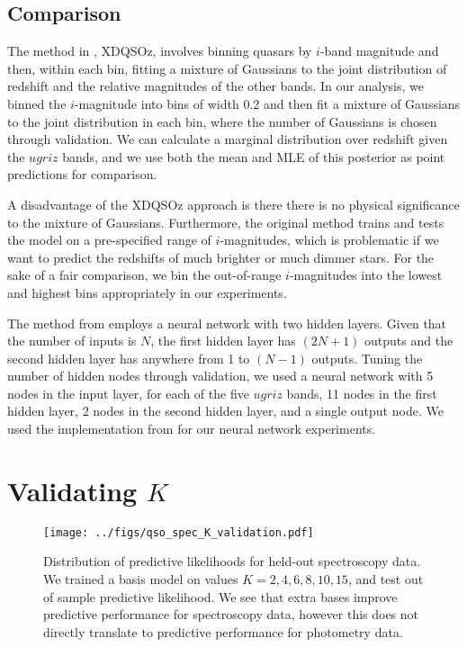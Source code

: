 \documentclass{article} %
\begin{document}
\subsection{Comparison}
The method in \cite{bovy2012photometric}, XDQSOz, involves binning
quasars by $i$-band magnitude and then, within each bin,
fitting a mixture of Gaussians to the joint distribution of
redshift and the relative magnitudes of the other bands. In our analysis, we binned
the $i$-magnitude
into bins of width 0.2 and then fit a mixture of Gaussians to the joint distribution in each bin,
where the number of Gaussians is chosen through validation. We can calculate a marginal distribution
over redshift given the $ugriz$ bands, and we use both the mean and MLE of this posterior as
point predictions for comparison.

A disadvantage of the XDQSOz approach is there there is no physical significance to the mixture
of Gaussians. 
Furthermore, the original method trains and tests the model on a pre-specified range of $i$-magnitudes, which is problematic if we want to predict
the redshifts of much brighter or much dimmer stars. For the sake of a fair comparison, we bin
the out-of-range $i$-magnitudes into the lowest and highest bins appropriately in our experiments.

The method from \cite{brescia2013photometric} employs a neural network with two hidden layers. Given that the number of inputs is $N$, the first hidden layer has $(2N + 1)$ outputs and the second hidden layer has anywhere from 1 to $(N - 1)$ outputs. Tuning the number of hidden nodes through validation, we used a neural network with 5 nodes in the input layer, for each of the five $ugriz$ bands, 11 nodes in the first hidden layer, 2 nodes in the second hidden layer, and a single output node.  We used the implementation from \cite{pybrain2010jmlr} for our neural network experiments.  


\section{Validating $K$}
\begin{figure}[t]
\texttt{[image: ../figs/qso\_spec\_K\_validation.pdf]}
\caption{Distribution of predictive likelihoods for held-out spectroscopy data.  We trained a basis model on values $K = 2, 4, 6, 8, 10, 15$, and test out of sample predictive likelihood.  We see that extra bases improve predictive performance for spectroscopy data, however this does not directly translate to predictive performance for photometry data.}
\label{fig:pred}
\end{figure}
\end{document}
